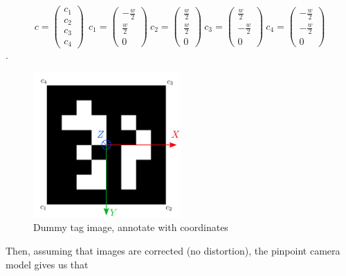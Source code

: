 \begin{equation}
    c =
    \begin{pmatrix}
    c_1 \\ c_2 \\ c_3 \\ c_4
    \end{pmatrix}
    ~~
    c_1 =  \begin{pmatrix} -\frac{w}{2} \\ \frac{w}{2} \\ 0 \end{pmatrix}
    ~ 
    c_2 =  \begin{pmatrix} \frac{w}{2} \\ \frac{w}{2} \\ 0 \end{pmatrix}
    ~
    c_3 =  \begin{pmatrix} \frac{w}{2} \\ -\frac{w}{2} \\ 0 \end{pmatrix}
    ~
    c_4 =  \begin{pmatrix} -\frac{w}{2} \\ -\frac{w}{2} \\ 0 \end{pmatrix}
\end{equation}.

%
\begin{figure}
    \centering
    \includegraphics[width=0.5\textwidth]{figures/tag12_frame.pdf}
    \caption{Dummy tag image, annotate with coordinates }
    \label{fig:tag_coordinate_frame}
\end{figure}

Then, assuming that images are corrected (no distortion), the pinpoint camera model gives us that

